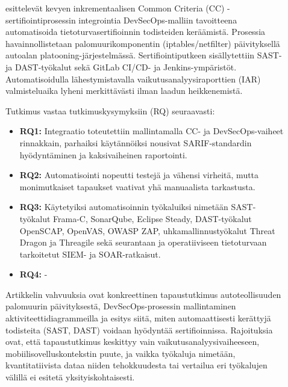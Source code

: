 \documentclass[bscthesis,finnish,oneside,biblatex]{uefcsthesis}
\begin{document}
\begin{description}
    \item[\cite{dupont2021_incremental}] esittelevät kevyen inkrementaalisen Common Criteria (CC) -sertifiointiprosessin integrointia DevSecOps-malliin tavoitteena automatisoida tietoturvasertifioinnin todisteiden keräämistä. Prosessia havainnollistetaan palomuurikomponentin (iptables/netfilter) päivityksellä autoalan platooning-järjestelmässä. Sertifiointiputkeen sisällytettiin SAST- ja DAST-työkalut sekä GitLab CI/CD- ja Jenkins-ympäristöt. Automatisoidulla lähestymistavalla vaikutusanalyysiraporttien (IAR) valmisteluaika lyheni merkittävästi ilman laadun heikkenemistä.

    Tutkimus vastaa tutkimuskysymyksiin (RQ) seuraavasti:
    \begin{itemize}
        \item \textbf{RQ1:} Integraatio toteutettiin mallintamalla CC- ja DevSecOps-vaiheet rinnakkain, parhaiksi käytännöiksi nousivat SARIF-standardin hyödyntäminen ja kaksivaiheinen raportointi.
        \item \textbf{RQ2:} Automatisointi nopeutti testejä ja vähensi virheitä, mutta monimutkaiset tapaukset vaativat yhä manuaalista tarkastusta.
        \item \textbf{RQ3:} Käytetyiksi automatisoinnin työkaluiksi nimetään SAST-työkalut Frama-C, SonarQube, Eclipse Steady, DAST-työkalut OpenSCAP, OpenVAS, OWASP ZAP, uhkamallinnustyökalut Threat Dragon ja Threagile sekä seurantaan ja operatiiviseen tietoturvaan tarkoitetut SIEM- ja SOAR-ratkaisut.
        \item \textbf{RQ4:} -
    \end{itemize}

    Artikkelin vahvuuksia ovat konkreettinen tapaustutkimus autoteollisuuden palomuurin päivityksestä, DevSecOps-prosessin mallintaminen aktiviteettidiagrammeilla  ja esitys siitä, miten automaattisesti kerättyjä todisteita (SAST, DAST) voidaan hyödyntää sertifioinnissa. Rajoituksia ovat, että tapaustutkimus keskittyy vain vaikutusanalyysivaiheeseen, mobiilisovelluskontekstin puute, ja vaikka työkaluja nimetään, kvantitatiivista dataa niiden tehokkuudesta tai vertailua eri työkalujen välillä ei esitetä yksityiskohtaisesti.
\end{description}

\begin{description}
\item[\cite{nutalapati2023_tools_techniques}]
\end{description}
\end{document}
